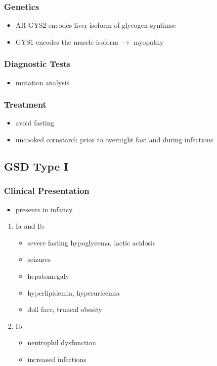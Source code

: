 \documentclass[12pt]{scrartcl}
\begin{document}
\subsubsection{Genetics}
\label{sec:org25602dc}
\begin{itemize}
\item AR GYS2 encodes liver isoform of glycogen synthase
\item GYS1 encodes the muscle isoform \(\to\) myopathy
\end{itemize}
\subsubsection{Diagnostic Tests}
\label{sec:orgdd3f0af}
\begin{itemize}
\item mutation analysis
\end{itemize}
\subsubsection{Treatment}
\label{sec:org5320b78}
\begin{itemize}
\item avoid fasting
\item uncooked cornstarch prior to overnight fast and during infections
\end{itemize}
\subsection{GSD Type I}
\label{sec:org73ee08d}
\subsubsection{Clinical Presentation}
\label{sec:org3095c25}
\begin{itemize}
\item presents in infancy
\end{itemize}
\begin{enumerate}
\item Ia and Ib
\label{sec:org2f18305}
\begin{itemize}
\item severe fasting hypoglycema, lactic acidosis
\item seizures
\item hepatomegaly
\item hyperlipidemia, hyperuricemia
\item doll face, truncal obesity
\end{itemize}
\item Ib
\label{sec:org2555017}
\begin{itemize}
\item neutrophil dysfunction
\item increased infections
\end{itemize}
\end{enumerate}
\end{document}
